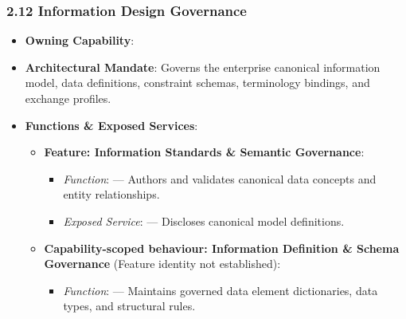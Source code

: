 \par\smallskip
{}\label{rad:ise:226}
\subsubsection*{2.12 Information Design Governance}
\label{rad:ise:227}

\begin{itemize}

\item
\textbf{Owning Capability}: \texttt{}



\item
\textbf{Architectural Mandate}: Governs the enterprise canonical information model, data definitions, constraint schemas, terminology bindings, and exchange profiles.



\item
\textbf{Functions \& Exposed Services}:


\begin{itemize}

\item
\textbf{Feature: Information Standards \& Semantic Governance}:


\begin{itemize}

\item
\emph{Function}: \texttt{} — Authors and validates canonical data concepts and entity relationships.



\item
\emph{Exposed Service}: \texttt{} — Discloses canonical model definitions.



\end{itemize}


\item
\textbf{Capability-scoped behaviour: Information Definition \& Schema Governance} (Feature identity not established):


\begin{itemize}

\item
\emph{Function}: \texttt{} — Maintains governed data element dictionaries, data types, and structural rules.




\end{itemize}
\end{itemize}
\end{itemize}
